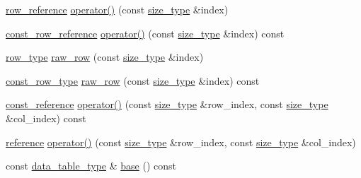 \begin{DoxyCompactItemize}
\item 
\hyperlink{classIceBRG_1_1labeled__array_a1bcd1efbba3ca49030c7acd8910195e6}{row\+\_\+reference} \hyperlink{classIceBRG_1_1labeled__array_a6c76089f2c974130b287b657ad0a0c93}{operator()} (const \hyperlink{lib_2IceBRG__main_2common_8h_a566c61f2ca17211f4ba8557f3f65e8d3}{size\+\_\+type} \&index)
\item 
\hyperlink{classIceBRG_1_1labeled__array_ac210266c8ef4db02af31dd1a1a2625f5}{const\+\_\+row\+\_\+reference} \hyperlink{classIceBRG_1_1labeled__array_ae2b67a7d8fd433b0e541c0f523b9a85d}{operator()} (const \hyperlink{lib_2IceBRG__main_2common_8h_a566c61f2ca17211f4ba8557f3f65e8d3}{size\+\_\+type} \&index) const 
\item 
\hyperlink{classIceBRG_1_1labeled__array_a49606864eaff0c45136282a32dd6f44f}{row\+\_\+type} \hyperlink{classIceBRG_1_1labeled__array_a6b642c2ad562b95ec68fddd17b5c8099}{raw\+\_\+row} (const \hyperlink{lib_2IceBRG__main_2common_8h_a566c61f2ca17211f4ba8557f3f65e8d3}{size\+\_\+type} \&index)
\item 
\hyperlink{classIceBRG_1_1labeled__array_adc26b87565fcd554a2b1f82adf965084}{const\+\_\+row\+\_\+type} \hyperlink{classIceBRG_1_1labeled__array_a0093c747a40f311314178e2323ed3637}{raw\+\_\+row} (const \hyperlink{lib_2IceBRG__main_2common_8h_a566c61f2ca17211f4ba8557f3f65e8d3}{size\+\_\+type} \&index) const 
\item 
\hyperlink{classIceBRG_1_1labeled__array_a334a51a867cad5d5c4ad682ebe1fd5a9}{const\+\_\+reference} \hyperlink{classIceBRG_1_1labeled__array_a74108c9da45de6d48a461ca1c0cc93b9}{operator()} (const \hyperlink{lib_2IceBRG__main_2common_8h_a566c61f2ca17211f4ba8557f3f65e8d3}{size\+\_\+type} \&row\+\_\+index, const \hyperlink{lib_2IceBRG__main_2common_8h_a566c61f2ca17211f4ba8557f3f65e8d3}{size\+\_\+type} \&col\+\_\+index) const 
\item 
\hyperlink{classIceBRG_1_1labeled__array_a2842648890bc2655f359ccfd4cb5ed63}{reference} \hyperlink{classIceBRG_1_1labeled__array_acabbc2f4f7334dfb9255f38914e64316}{operator()} (const \hyperlink{lib_2IceBRG__main_2common_8h_a566c61f2ca17211f4ba8557f3f65e8d3}{size\+\_\+type} \&row\+\_\+index, const \hyperlink{lib_2IceBRG__main_2common_8h_a566c61f2ca17211f4ba8557f3f65e8d3}{size\+\_\+type} \&col\+\_\+index)
\item 
const \hyperlink{classIceBRG_1_1labeled__array_a43d1c710fe591f9610ab9e9827aabba6}{data\+\_\+table\+\_\+type} \& \hyperlink{classIceBRG_1_1labeled__array_af7521b8381d27f67bdbf6c4ad40d25a3}{base} () const 
\item 

\end{DoxyCompactItemize}

